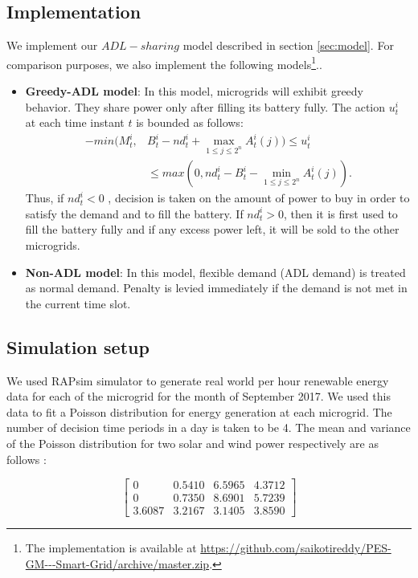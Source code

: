 \subsection{Implementation}
We implement our $ADL-sharing$ model described in section \ref{sec:model}. For comparison purposes, we also implement the following models\footnote{The implementation is available at \url{https://github.com/saikotireddy/PES-GM---Smart-Grid/archive/master.zip}.}.. 
\begin{itemize}
	\item \textbf{Greedy-ADL model}: In this model, microgrids will exhibit greedy behavior. They share power only after filling its battery fully. The action $u_t^i$ at each time instant $t$ is bounded as follows:  
	\begin{align}
	-min(M_t^i, & B_t^i - nd_t^i + \max_{1\leq j \leq 2^n} A_t^i(j) ) \leq u_t^i \nonumber\\ &\leq max(0, nd_t^i - B_t^i - \min_{1\leq j \leq 2^n} A_t^i(j)).
	\end{align}
	Thus, if $ nd_t^i < 0$ , decision is taken on the amount of power to buy in order to satisfy the demand and to fill the battery. If $ nd_t^i > 0$, then it is first used to fill the battery fully and if any excess power left, it will be sold to the other microgrids.
	
	\item \textbf{Non-ADL model}:  In this model, flexible demand (ADL demand) is treated as normal demand. Penalty is levied immediately if the demand is not met in the current time slot.
\end{itemize}
\subsection{Simulation setup}
We used RAPsim simulator to generate real world per hour renewable energy data for each of the microgrid  for the month of September 2017. We used this data to fit a Poisson distribution for energy generation at each microgrid. The number of decision time periods in a day is taken to be 4. The mean and variance of the Poisson distribution for two solar and wind power respectively are as follows :

$$ \left[ \begin{array}{cccc}
	0 & 0.5410 & 6.5965 & 4.3712 \\
	0 & 0.7350 & 8.6901 & 5.7239 \\
	3.6087 & 3.2167 & 3.1405 & 3.8590
\end{array} \right]$$


